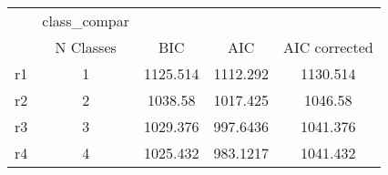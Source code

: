 \begin{tabular}{l*{4}{c}}
\hline\hline
            &class\_compar&            &            &            \\
            &   N Classes&         BIC&         AIC&AIC corrected\\
\hline
r1          &           1&    1125.514&    1112.292&    1130.514\\
r2          &           2&     1038.58&    1017.425&     1046.58\\
r3          &           3&    1029.376&    997.6436&    1041.376\\
r4          &           4&    1025.432&    983.1217&    1041.432\\
\hline\hline
\end{tabular}

